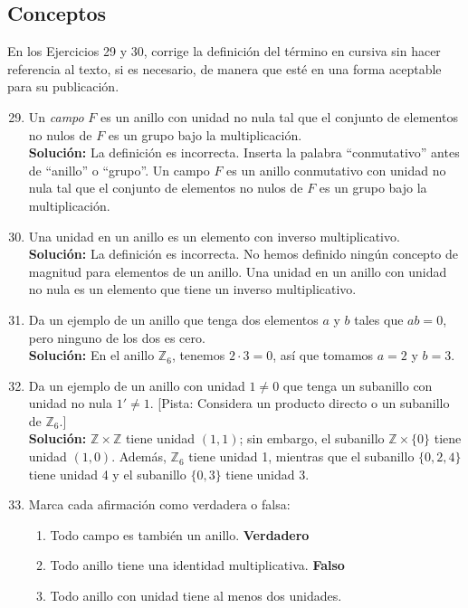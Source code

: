 \subsection*{Conceptos}
\noindent
En los Ejercicios 29 y 30, corrige la definición del término en cursiva sin hacer referencia al texto, si es necesario, de manera que esté en una forma aceptable para su publicación.
\begin{enumerate}
	\setcounter{enumi}{28}
	\item Un \textit{campo} $F$ es un anillo con unidad no nula tal que el conjunto de elementos no nulos de $F$ es un grupo bajo la multiplicación.
	\\ \textbf{Solución:}
	La definición es incorrecta. Inserta la palabra  ``conmutativo'' antes de ``anillo'' o ``grupo''.
	Un campo $F$ es un anillo conmutativo con unidad no nula tal que el conjunto de elementos no nulos de $F$ es un grupo bajo la multiplicación.
	\item Una unidad en un anillo es un elemento con inverso multiplicativo.
	\\ \textbf{Solución:}
	La definición es incorrecta. No hemos definido ningún concepto de magnitud para elementos de un anillo.
	Una unidad en un anillo con unidad no nula es un elemento que tiene un inverso multiplicativo.
	\item 	Da un ejemplo de un anillo que tenga dos elementos $a$ y $b$ tales que $ab = 0$, pero ninguno de los dos es cero.
	\\ \textbf{Solución:}
	En el anillo $\mathbb{Z}_6$, tenemos $2 \cdot 3 = 0$, así que tomamos $a = 2$ y $b = 3$.
	\item Da un ejemplo de un anillo con unidad $1\not=0$ que tenga un subanillo con unidad no nula $1'\not=1$. [Pista: Considera un producto directo o un subanillo de $\mathbb{Z}_{6}$.]
	\\ \textbf{Solución:}
	$\mathbb{Z} \times \mathbb{Z}$ tiene unidad $(1, 1)$; sin embargo, el subanillo $\mathbb{Z} \times \{0\}$ tiene unidad $(1, 0)$. Además, $\mathbb{Z}_6$ tiene unidad 1, mientras que el subanillo $\{0, 2, 4\}$ tiene unidad 4 y el subanillo $\{0, 3\}$ tiene unidad 3.
	\item Marca cada afirmación como verdadera o falsa:
	\begin{enumerate}
		\item Todo campo es también un anillo. 
		\textbf{Verdadero}
		\item Todo anillo tiene una identidad multiplicativa.
		\textbf{Falso}
		\item Todo anillo con unidad tiene al menos dos unidades.

\end{enumerate}
\end{enumerate}

